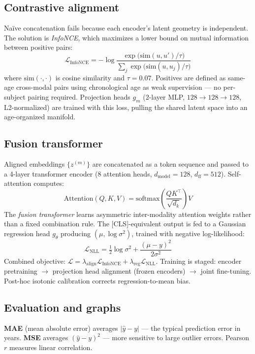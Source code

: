 \documentclass[11pt]{article}
\begin{document}
\begin{tcolorbox}[L3box]
\subsection{Contrastive alignment}

Naïve concatenation fails because each encoder's latent geometry is independent. The solution is \textit{InfoNCE}, which maximizes a lower bound on mutual information between positive pairs:
\[
\mathcal{L}_{\text{InfoNCE}} = -\log \frac{\exp\!\bigl(\mathrm{sim}(u, u') / \tau\bigr)}{\sum_j \exp\!\bigl(\mathrm{sim}(u, u_j) / \tau\bigr)}
\]
where $\mathrm{sim}(\cdot,\cdot)$ is cosine similarity and $\tau = 0.07$. Positives are defined as same-age cross-modal pairs using chronological age as weak supervision --- no per-subject pairing required. Projection heads $g_m$ (2-layer MLP, $128\to128\to128$, L2-normalized) are trained with this loss, pulling the shared latent space into an age-organized manifold.

\subsection{Fusion transformer}

Aligned embeddings $\{z^{(m)}\}$ are concatenated as a token sequence and passed to a 4-layer transformer encoder (8 attention heads, $d_\text{model}=128$, $d_\text{ff}=512$). Self-attention computes:
\[
\mathrm{Attention}(Q,K,V) = \mathrm{softmax}\!\left(\frac{QK^\top}{\sqrt{d_k}}\right)V
\]
The \textit{fusion transformer} learns asymmetric inter-modality attention weights rather than a fixed combination rule. The [CLS]-equivalent output is fed to a Gaussian regression head $g_\theta$ producing $(\mu, \log\sigma^2)$, trained with negative log-likelihood:
\[
\mathcal{L}_{\text{NLL}} = \tfrac{1}{2}\log\sigma^2 + \frac{(\mu - y)^2}{2\sigma^2}
\]
Combined objective: $\mathcal{L} = \lambda_\text{align}\mathcal{L}_\text{InfoNCE} + \lambda_\text{reg}\mathcal{L}_\text{NLL}$. Training is staged: encoder pretraining $\to$ projection head alignment (frozen encoders) $\to$ joint fine-tuning. Post-hoc isotonic calibration corrects regression-to-mean bias.

\subsection{Evaluation and graphs}

\textbf{MAE} (mean absolute error) averages $|\hat{y}-y|$ --- the typical prediction error in years. \textbf{MSE} averages $(\hat{y}-y)^2$ --- more sensitive to large outlier errors. Pearson $r$ measures linear correlation.


\end{tcolorbox}
\end{document}
